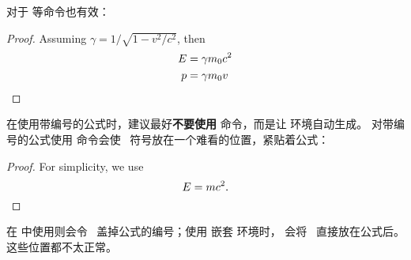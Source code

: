  对于  等命令也有效：
\begin{example}
\begin{proof}
Assuming $\gamma 
= 1/\sqrt{1-v^2/c^2}$, then
\begin{align*}
E &= \gamma m_0 c^2  \\
p &= \gamma m_0v \qedhere
\end{align*}
\end{proof}
\end{example}

在使用带编号的公式时，建议最好\textbf{不要使用}  命令，而是让  环境自动生成。
对带编号的公式使用  命令会使 \qedsymbol\ 符号放在一个难看的位置，紧贴着公式：
\begin{example}
\begin{proof}
For simplicity, we use
\begin{equation}
E=mc^2.\qedhere
\end{equation}
\end{proof}
\end{example}

在  中使用则会令 \qedsymbol\ 盖掉公式的编号；使用  嵌套  环境时，
 会将 \qedsymbol\ 直接放在公式后。这些位置都不太正常。

\endinput
